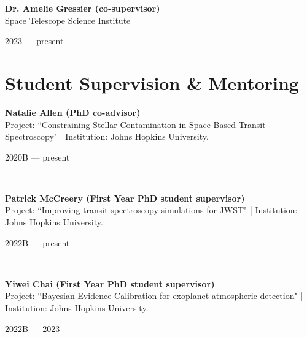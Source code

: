 \documentclass[12pt, a4paper]{article} %
\begin{document}
\begin{minipage}[t]{0.7\textwidth}
\begin{flushleft}%
  \setlength{\leftskip}{0.2cm}%
\textbf{Dr. Amelie Gressier (co-supervisor)}\\
Space Telescope Science Institute
\end{flushleft}
\end{minipage}
\begin{minipage}[t]{0.3\textwidth}
\hfill 2023 --- present
\end{minipage}

\section*{Student Supervision \& Mentoring}

\begin{minipage}[t]{0.7\textwidth}
\begin{flushleft}%
  \setlength{\leftskip}{0.2cm}%
\textbf{Natalie Allen (PhD co-advisor)}\\
Project: ``Constraining Stellar Contamination in Space Based Transit Spectroscopy" | Institution: Johns Hopkins University.
\end{flushleft}
\end{minipage}
\begin{minipage}[t]{0.3\textwidth}
\hfill 2020B --- present
\end{minipage}\\

\begin{minipage}[t]{0.7\textwidth}
\begin{flushleft}%
  \setlength{\leftskip}{0.2cm}%
\textbf{Patrick McCreery (First Year PhD student supervisor)}\\
Project: ``Improving transit spectroscopy simulations for JWST" | Institution: Johns Hopkins University.
\end{flushleft}
\end{minipage}
\begin{minipage}[t]{0.3\textwidth}
\hfill 2022B --- present
\end{minipage}\\

\begin{minipage}[t]{0.7\textwidth}
\begin{flushleft}%
  \setlength{\leftskip}{0.2cm}%
\textbf{Yiwei Chai (First Year PhD student supervisor)}\\
Project: ``Bayesian Evidence Calibration for exoplanet atmospheric detection" | Institution: Johns Hopkins University.
\end{flushleft}
\end{minipage}
\begin{minipage}[t]{0.3\textwidth}
\hfill 2022B --- 2023
\end{minipage}\\
\end{document}
